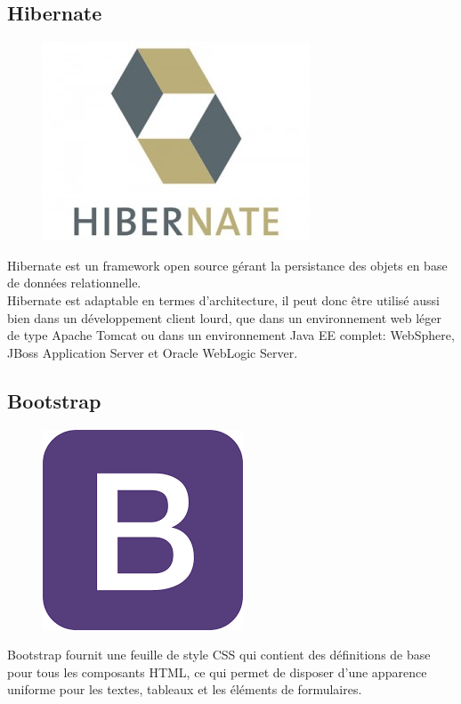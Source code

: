 \documentclass[12pt,a4paper]{report}
\begin{document}
		\subsection{Hibernate}
		\begin{figure}
		\includegraphics[scale=0.25]{./graphics/hibernate.jpg}
		\end{figure}
		Hibernate est un framework open source gérant la persistance des objets en base de données relationnelle.\\
Hibernate est adaptable en termes d'architecture, il peut donc être utilisé aussi bien dans un développement client lourd, que dans un environnement web léger de type Apache Tomcat ou dans un environnement Java EE complet: WebSphere, JBoss Application Server et Oracle WebLogic Server.\\
		\newpage
		\subsection{Bootstrap}
		\begin{figure}
		\includegraphics[scale=0.25]{./graphics/bootstrap.png}
		\end{figure}
		Bootstrap fournit une feuille de style CSS qui contient des définitions de base pour tous les composants HTML, ce qui permet de disposer d'une apparence uniforme pour les textes, tableaux et les éléments de formulaires.\\
\end{document}
